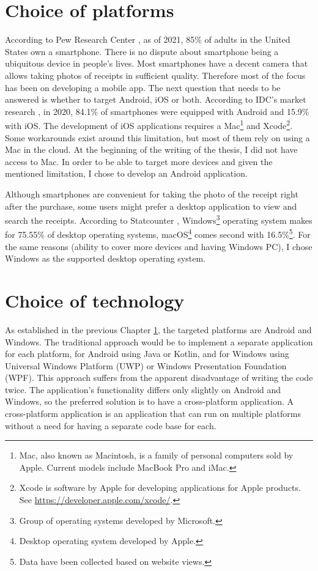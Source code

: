 \documentclass[
  digital, %
  table,   %
  oneside, %
  lof,     %
  lot,     %
]{fithesis3}
\begin{document}
\chapter{Choice of platforms}
\label{chap:choice_of_platforms}
According to Pew Research Center \cite{PewResearchCenter2021Mobile}, as of 2021, 85\% of adults in the United States own a smartphone. There is no dispute about smartphone being a ubiquitous device in people's lives. 
Most smartphones have a decent camera that allows taking photos of receipts in sufficient quality. Therefore most of the focus has been on developing a mobile app.
The next question that needs to be answered is whether to target Android, iOS or both. According to IDC's market research \cite{Idc2021Smartphone}, in 2020, 84.1\% of smartphones were equipped with Android and 15.9\% with iOS. The development of iOS applications requires a Mac\footnote{Mac, also known as Macintosh, is a family of personal computers sold by Apple. Current models include MacBook Pro and iMac.} and Xcode\footnote{Xcode is software by Apple for developing applications for Apple products. See \url{https://developer.apple.com/xcode/}.}. Some workarounds exist around this limitation, but most of them rely on using a Mac in the cloud. At the beginning of the writing of the thesis, I did not have access to Mac. In order to be able to target more devices and given the mentioned limitation, I chose to develop an Android application.

Although smartphones are convenient for taking the photo of the receipt right after the purchase, some users might prefer a desktop application to view and search the receipts.
According to Statcounter \cite{Statcounter2021Desktop}, Windows\footnote{Group of operating systems developed by Microsoft.} operating system makes for 75.55\% of desktop operating systems, macOS\footnote{Desktop operating system developed by Apple.} comes second with 16.5\%\footnote{Data have been collected based on website views.}.
For the same reasons (ability to cover more devices and having Windows PC), I chose Windows as the supported desktop operating system.

\chapter{Choice of technology}
As established in the previous Chapter \ref{chap:choice_of_platforms}, the targeted platforms are Android and Windows. The traditional approach would be to implement a separate application for each platform, for Android using Java or Kotlin, and for Windows using Universal Windows Platform (UWP) or Windows Presentation Foundation (WPF). This approach suffers from the apparent disadvantage of writing the code twice. The application's functionality differs only slightly on Android and Windows, so the preferred solution is to have a cross-platform application. A cross-platform application is an application that can run on multiple platforms without a need for having a separate code base for each.
\end{document}
